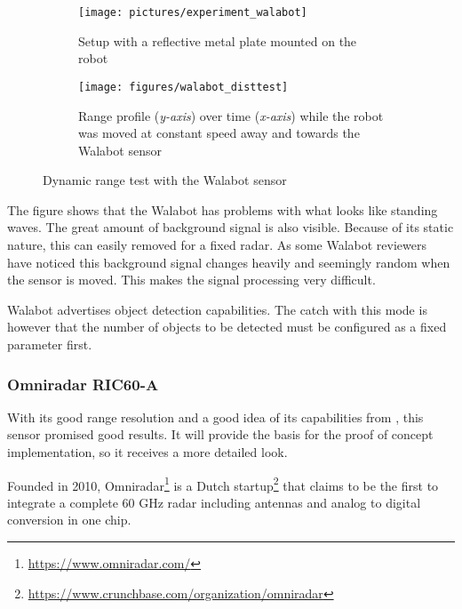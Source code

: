 \begin{figure}[htbp]
    \centering


    \begin{subfigure}[t]{0.2618405121\textwidth}
        \texttt{[image: pictures/experiment\_walabot]}
        \caption{Setup with a reflective metal plate mounted on the robot}
        \label{fig:walabot_dynamic_setup}
    \end{subfigure}%
    \hfill%
    \begin{subfigure}[t]{0.68815948789\textwidth}
        \texttt{[image: figures/walabot\_disttest]}
        \caption{Range profile (\textit{y-axis}) over time (\textit{x-axis}) while the robot was moved at constant speed away and towards the Walabot sensor}
        \label{fig:walabot_dynamic_data}
    \end{subfigure}%
    \caption{Dynamic range test with the Walabot sensor}
\end{figure}

The figure shows that the Walabot has problems with what looks like
standing waves. The great amount of background signal is also visible.
Because of its static nature, this can easily removed for a fixed radar.
As some Walabot reviewers have noticed \cite{Valens2016} this background
signal changes heavily and seemingly random when the sensor is moved.
This makes the signal processing very difficult.

Walabot advertises object detection capabilities. The catch with this
mode is however that the number of objects to be detected must be
configured as a fixed parameter first.

\subsubsection{Omniradar RIC60-A}\label{omniradar}

With its good range resolution and a good idea of its capabilities from \cite{Ernst2016}, this sensor promised good results. It will provide the basis for the proof of concept implementation, so it receives a more detailed look.

Founded in 2010, Omniradar\footnote{\url{https://www.omniradar.com/}} is a Dutch
startup\footnote{\url{https://www.crunchbase.com/organization/omniradar}} that
claims to be the first to integrate a complete 60 GHz radar including
antennas and analog to digital conversion in one chip.


